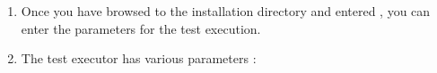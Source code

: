 
\begin{enumerate}
\item Once you have browsed to the  installation directory and entered , you can enter the parameters for the test execution.
\item The test executor has various parameters :

\clearpage

\label{cmdlineparams}
\begin{supertabular}{|p{4.0cm}p{8.0cm}|}
\hline


\end{supertabular}
\end{enumerate}
